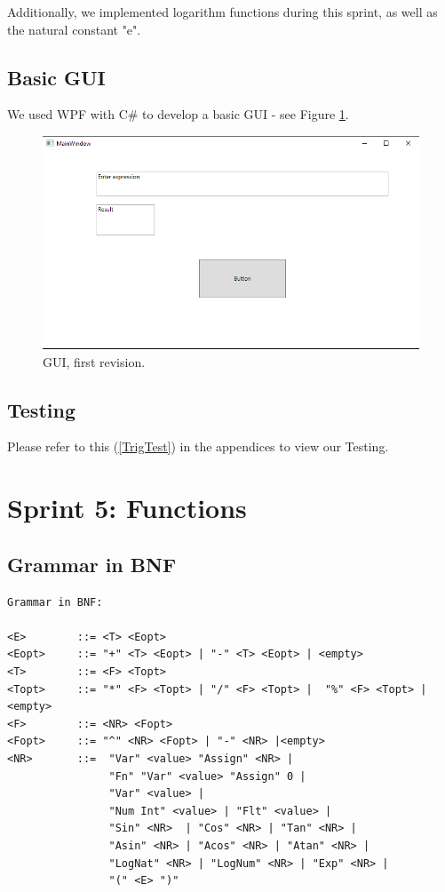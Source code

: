 \documentclass[a4paper, oneside, 11pt]{report}
\begin{document}
Additionally, we implemented logarithm functions during this sprint, as well as the natural constant "e".

\subsection{Basic GUI}
We used WPF with C\# to develop a basic GUI - see Figure \ref{gui01}.
\begin{figure}[htb]
\begin{center}

\includegraphics[width=0.9 \columnwidth]{GUI_01}

\caption{GUI, first revision.}
\label{gui01}
\end{center}
\end{figure}

\subsection{Testing}
Please refer to this (\ref{TrigTest}) in the appendices to view our Testing. \\


\clearpage
\section{Sprint 5: Functions}
\subsection{Grammar in BNF}
\begin{verbatim}
Grammar in BNF:

<E>        ::= <T> <Eopt>
<Eopt>     ::= "+" <T> <Eopt> | "-" <T> <Eopt> | <empty>
<T>        ::= <F> <Topt>
<Topt>     ::= "*" <F> <Topt> | "/" <F> <Topt> |  "%" <F> <Topt> |<empty>
<F>        ::= <NR> <Fopt>
<Fopt>     ::= "^" <NR> <Fopt> | "-" <NR> |<empty> 
<NR>       ::=  "Var" <value> "Assign" <NR> |
                "Fn" "Var" <value> "Assign" 0 |
                "Var" <value> |
                "Num Int" <value> | "Flt" <value> | 
                "Sin" <NR>  | "Cos" <NR> | "Tan" <NR> |
                "Asin" <NR> | "Acos" <NR> | "Atan" <NR> |
                "LogNat" <NR> | "LogNum" <NR> | "Exp" <NR> |
                "(" <E> ")"
\end{verbatim}
\end{document}
